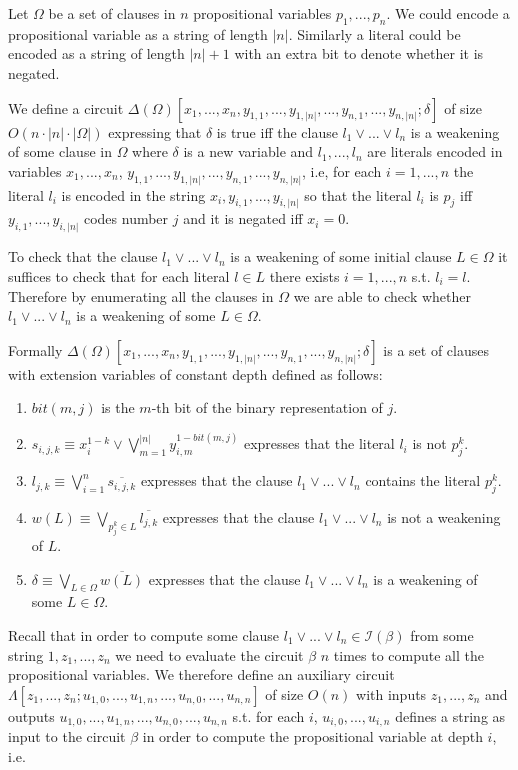 \documentclass{LMCS}
\theoremstyle{plain}\newtheorem{satz}[thm]{Satz}
\begin{document}
Let $\Omega$ be a set of clauses in $n$ propositional variables $p_1,...,p_n$. We could encode a propositional variable as a string of length $|n|$. Similarly a literal could be encoded as a string of length $|n|+1$ with an extra bit to denote whether it is negated.

We define a circuit $\Delta(\Omega) [x_1,...,x_n, y_{1,1},...,y_{1,|n|},...,y_{n,1},...,y_{n,|n|};\delta]$ of size $O(n \cdot |n| \cdot |\Omega|)$ expressing that $\delta$ is true iff the clause $l_1 \lor ... \lor l_n$ is a weakening of some clause in $\Omega$ where $\delta$ is a new variable and $l_1,...,l_n$ are literals encoded in variables $x_1,...,x_n$, $y_{1,1},...,y_{1,|n|},...,y_{n,1},...,y_{n,|n|}$, i.e, for each $i=1,...,n$  the literal $l_i$ is encoded in the string $x_i,y_{i,1},...,y_{i,|n|}$ so that the literal $l_i$ is $p_j$ iff $y_{i,1},...,y_{i,|n|}$ codes number $j$ and it is negated iff $x_i = 0$.

To check that the clause $l_1 \lor ... \lor l_n$ is a weakening of some initial clause $L \in \Omega$ it suffices to check that for each literal $l \in L$ there exists $i=1,...,n$ s.t. $l_i=l$. Therefore by enumerating all the clauses in $\Omega$ we are able to check whether $l_1 \lor ... \lor l_n$ is a weakening of some $L \in \Omega$.

Formally $\Delta(\Omega) [x_1,...,x_n, y_{1,1},...,y_{1,|n|},...,y_{n,1},...,y_{n,|n|};\delta]$ is a set of clauses with extension variables of constant depth defined as follows:
\begin{enumerate}[$-$]
\item
$bit(m,j)$ is the $m$-th bit of the binary representation of $j$.
\item
$s_{i,j,k} \equiv x_i^{1-k} \lor \displaystyle{\bigvee_{m=1}^{|n|}y_{i,m}^{1-bit(m,j)}}$ expresses that the literal $l_i$ is not $p_j^k$.
\item
$l_{j,k} \equiv \displaystyle{\bigvee_{i=1}^n \overline{s_{i,j,k}}}$ expresses that the clause $l_1 \lor ... \lor l_n$ contains the literal $p_j^k$.
\item
$w(L) \equiv \displaystyle{\bigvee_{p_j^k \in L}\overline{l_{j,k}}}$ expresses that the clause $l_1 \lor ... \lor l_n$ is not a weakening of $L$.
\item
$\delta \equiv \displaystyle{\bigvee_{L \in \Omega} \overline{w(L)}}$ expresses that the clause $l_1 \lor ... \lor l_n$ is a weakening of some $L \in \Omega$.
\end{enumerate}
Recall that in order to compute some clause $l_1 \lor ... \lor l_n \in {\mathcal I}(\beta)$ from some string $1,z_1,...,z_n$ we need to evaluate the circuit $\beta$ $n$ times to compute all the propositional variables. We therefore define an auxiliary circuit $\Lambda[z_1,...,z_n;u_{1,0},...,u_{1,n},...,u_{n,0},...,u_{n,n}]$ of size $O(n)$ with inputs $z_1,...,z_n$ and outputs $u_{1,0},...,u_{1,n},...,u_{n,0},...,u_{n,n}$ s.t. for each $i$, $u_{i,0},...,u_{i,n}$ defines a string as input to the circuit $\beta$ in order to compute the propositional variable at depth $i$, i.e.
\end{document}
